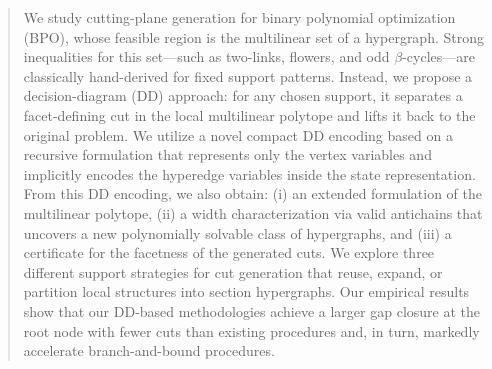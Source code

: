 \documentclass[smallextended]{svjour3}       %
\begin{document}
\begin{abstract}

We study cutting-plane generation for binary polynomial optimization (BPO), whose feasible region is the multilinear set of a hypergraph. Strong inequalities for this set---such as two-links, flowers, and odd $\beta$-cycles---are classically hand-derived for fixed support patterns. Instead, we propose a decision-diagram (DD) approach: for any chosen support, it separates a facet-defining cut in the local multilinear polytope and lifts it back to the original problem. We utilize a novel compact DD encoding based on a recursive formulation that represents only the vertex variables and implicitly encodes the hyperedge variables inside the state representation. From this DD encoding, we also obtain: (i) an extended formulation of the multilinear polytope, (ii) a width characterization via valid antichains that uncovers a new polynomially solvable class of hypergraphs, and (iii) a certificate for the facetness of the generated cuts. We explore three different support strategies for cut generation that reuse, expand, or partition local structures into section hypergraphs. Our empirical results show that our DD-based methodologies achieve a larger gap closure at the root node with fewer cuts than existing procedures and, in turn, markedly accelerate branch-and-bound procedures.

\end{abstract}
\end{document}
